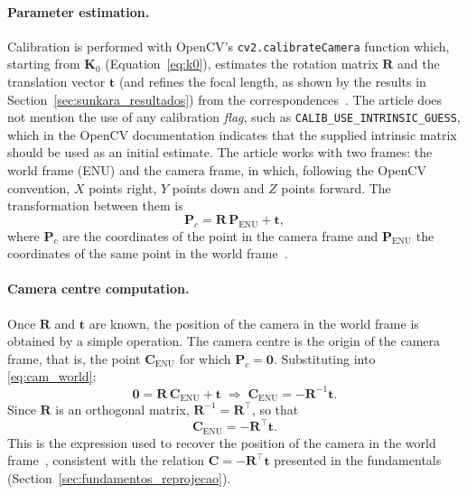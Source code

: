 \paragraph{Parameter estimation.} Calibration is performed with OpenCV's \texttt{cv2.calibrateCamera} function which, starting from $\mathbf{K}_0$ (Equation~\eqref{eq:k0}), estimates the rotation matrix $\mathbf{R}$ and the translation vector $\mathbf{t}$ (and refines the focal length, as shown by the results in Section~\ref{sec:sunkara_resultados}) from the correspondences~\cite{sunkara2025}. The article does not mention the use of any calibration \textit{flag}, such as \texttt{CALIB\_USE\_INTRINSIC\_GUESS}, which in the OpenCV documentation indicates that the supplied intrinsic matrix should be used as an initial estimate. The article works with two frames: the world frame (ENU) and the camera frame, in which, following the OpenCV convention, $X$ points right, $Y$ points down and $Z$ points forward. The transformation between them is
\begin{equation}
    \mathbf{P}_c=\mathbf{R}\,\mathbf{P}_{\mathrm{ENU}}+\mathbf{t},
    \label{eq:cam_world}
\end{equation}
where $\mathbf{P}_c$ are the coordinates of the point in the camera frame and $\mathbf{P}_{\mathrm{ENU}}$ the coordinates of the same point in the world frame~\cite{sunkara2025}.

\paragraph{Camera centre computation.} Once $\mathbf{R}$ and $\mathbf{t}$ are known, the position of the camera in the world frame is obtained by a simple operation. The camera centre is the origin of the camera frame, that is, the point $\mathbf{C}_{\mathrm{ENU}}$ for which $\mathbf{P}_c=\mathbf{0}$. Substituting into \eqref{eq:cam_world}:
\begin{equation}
    \mathbf{0}=\mathbf{R}\,\mathbf{C}_{\mathrm{ENU}}+\mathbf{t}
    \;\Rightarrow\;
    \mathbf{C}_{\mathrm{ENU}}=-\mathbf{R}^{-1}\mathbf{t}.
\end{equation}
Since $\mathbf{R}$ is an orthogonal matrix, $\mathbf{R}^{-1}=\mathbf{R}^{\top}$, so that
\begin{equation}
    \mathbf{C}_{\mathrm{ENU}}=-\mathbf{R}^{\top}\mathbf{t}.
    \label{eq:cam_center}
\end{equation}
This is the expression used to recover the position of the camera in the world frame~\cite{sunkara2025}, consistent with the relation $\mathbf{C}=-\mathbf{R}^{\top}\mathbf{t}$ presented in the fundamentals (Section~\ref{sec:fundamentos_reprojecao}).

